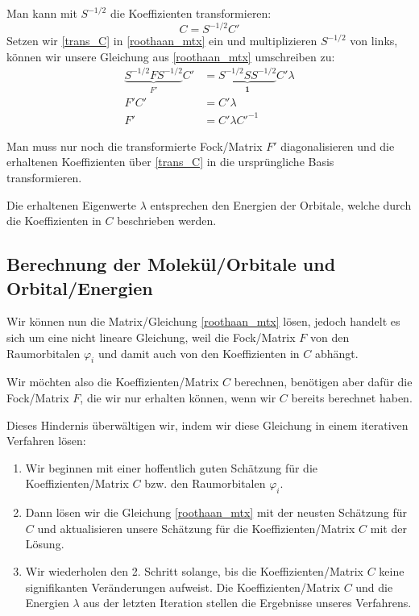 Man kann mit $S^{-1/2}$ die Koeffizienten transformieren:
\begin{equation}\label{trans_C}
    C = S^{-1/2} C'
\end{equation}
Setzen wir \cref{trans_C} in \cref{roothaan_mtx} ein und multiplizieren $S^{-1/2}$ von links,
können wir unsere Gleichung aus \cref{roothaan_mtx} umschreiben zu:
\begin{equation}
    \begin{aligned}
    \underbrace{S^{-1/2}FS^{-1/2}}_{F'}C' &= \underbrace{S^{-1/2}SS^{-1/2}}_{\mathbf{1}}C'\lambda\\
    F'C' &= C'\lambda\\
    F'&= C'\lambda C'^{-1}
    \end{aligned}
\end{equation}

Man muss nur noch die transformierte Fock\-/Matrix $F'$ diagonalisieren und 
die erhaltenen Koeffizienten über \cref{trans_C} in die ursprüngliche Basis transformieren.

Die erhaltenen Eigenwerte $\lambda$ entsprechen den Energien der Orbitale,
welche durch die Koeffizienten in $C$ beschrieben werden.

\cite[S. 142-145]{szabo_ostlund_1996}

\subsection{Berechnung der Molekül\-/Orbitale und Orbital\-/Energien}
Wir können nun die Matrix\-/Gleichung \cref{roothaan_mtx} lösen,
jedoch handelt es sich um eine nicht lineare Gleichung, weil die Fock\-/Matrix $F$
von den Raumorbitalen $\varphi_i$ und damit auch von den Koeffizienten in $C$ abhängt.

Wir möchten also die Koeffizienten\-/Matrix $C$ berechnen,
benötigen aber dafür die Fock\-/Matrix $F$, die wir nur erhalten können,
wenn wir $C$ bereits berechnet haben.

Dieses Hindernis überwältigen wir,
indem wir diese Gleichung in einem iterativen Verfahren lösen:
\begin{enumerate}
    \item Wir beginnen mit einer hoffentlich guten Schätzung
    für die Koeffizienten\-/Matrix $C$ bzw. den Raumorbitalen $\varphi_i$.
    \item Dann lösen wir die Gleichung \cref{roothaan_mtx} mit der neusten Schätzung
    für $C$ und aktualisieren unsere Schätzung
    für die Koeffizienten\-/Matrix $C$ mit der Lösung.
    \item Wir wiederholen den 2. Schritt solange, bis die Koeffizienten\-/Matrix $C$
    keine signifikanten Veränderungen aufweist. Die Koeffizienten\-/Matrix $C$
    und die Energien $\lambda$ aus der letzten Iteration stellen die Ergebnisse
    unseres Verfahrens. 
\end{enumerate}

